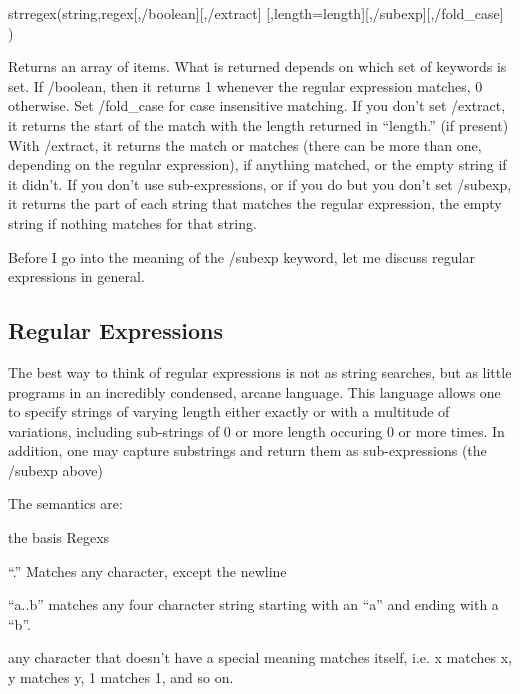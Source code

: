 \bi
  \item strregex(string,regex[,/boolean][,/extract]
          [,length=length][,/subexp][,/fold\_case] )

   Returns an array of items. What is returned depends on which set of
  keywords is set. If /boolean, then it returns 1 whenever the regular
  expression matches, 0 otherwise. Set /fold\_case for case
  insensitive matching. If you don't set /extract, it returns the
  start of the match with the length returned in ``length.'' (if
  present) With /extract, it returns the match or matches (there can
  be more than one, depending on the regular expression), if anything
  matched, or the empty string if it didn't. If you don't use
  sub-expressions, or if you do but you don't set /subexp, it returns
  the part of each string that matches the regular expression, the
  empty string if nothing matches for that string. 

  Before I go into the meaning of the /subexp keyword, let me discuss
  regular expressions in general. 

  

\ei

  \subsection{Regular Expressions}%

  The best way to think of regular expressions is not as string
  searches,  but as little programs in an incredibly
  condensed, arcane language. This language allows one to specify
  strings of varying length either exactly or with a multitude of
  variations, including sub-strings of 0 or more length occuring 0 or
  more times. In addition, one may capture substrings and return them
  as sub-expressions (the /subexp above)

  The semantics are:

  \bi

    \item the basis Regexs
     \bi
        \item ``.'' Matches any character, except the newline

	  ``a..b'' matches any four character string starting with an
  ``a'' and ending with a ``b''.

	\item any character that doesn't have a special meaning
  matches itself, i.e. x matches x, y matches y, 1 matches 1, and so
  on.

